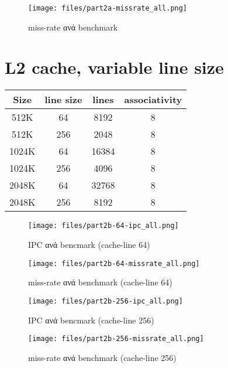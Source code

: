 \documentclass[a4paper,9pt]{article}
\begin{document}
\begin{figure}[H]
    \centering
    \texttt{[image: files/part2a-missrate\_all.png]}
    \caption{miss-rate ανά benchmark}
\end{figure}


\pagebreak


\section{L2 cache, variable line size}

\begin{tabular}{c c c c}
    Size & line size & lines & associativity\\ 
    \hline
    \hline
    512K   & 64  & 8192  & 8\\
    512K   & 256 & 2048  & 8\\
    \hline
    1024K  & 64  & 16384 & 8\\
    1024K  & 256 & 4096  & 8\\
    \hline
    2048K  & 64  & 32768 & 8\\
    2048K  & 256 & 8192  & 8\\
\end{tabular}

\begin{figure}[H]
    \centering
    \texttt{[image: files/part2b-64-ipc\_all.png]}
    \caption{IPC ανά bencmark (cache-line 64)}
\end{figure}

\begin{figure}[H]
    \centering
    \texttt{[image: files/part2b-64-missrate\_all.png]}
    \caption{miss-rate ανά benchmark (cache-line 64)}
\end{figure}

\begin{figure}[H]
    \centering
    \texttt{[image: files/part2b-256-ipc\_all.png]}
    \caption{IPC ανά bencmark (cache-line 256)}
\end{figure}

\begin{figure}[H]
    \centering
    \texttt{[image: files/part2b-256-missrate\_all.png]}
    \caption{miss-rate ανά benchmark (cache-line 256)}
\end{figure}

\end{document}
